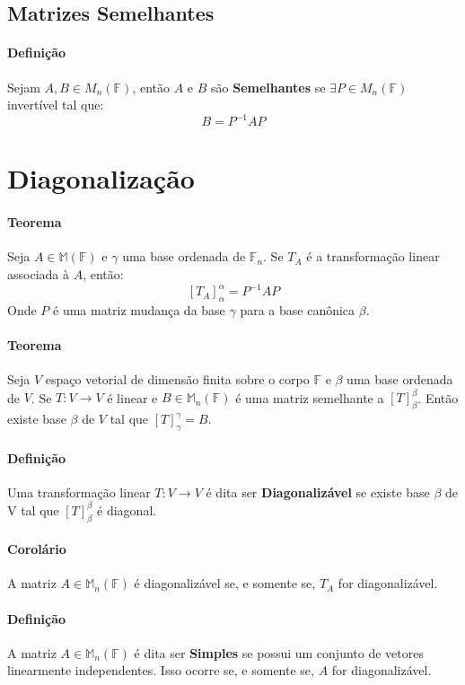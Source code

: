 \documentclass{article}
\begin{document}
        \subsection{Matrizes Semelhantes}
            \paragraph{Definição}Sejam $A, B \in M_{n}(\mathbb{F})$, então $A$ e $B$ são \textbf{Semelhantes} se $\exists P\in M_{n}(\mathbb{F})$ invertível tal que:
                \[\boxed{B = P^{-1} A P}\]
\newpage

    \section{Diagonalização}
        \paragraph{Teorema}Seja $A\in\mathbb{M}(\mathbb{F})$ e $\gamma$ uma base ordenada de $\mathbb{F}_{n}$. Se $T_{A}$ é a transformação linear associada à $A$, então:
            \[\boxed{[T_{A}]_{\alpha}^{\alpha} = P^{-1} A P}\]
        Onde $P$ é uma matriz mudança da base $\gamma$ para a base canônica $\beta$.

        \paragraph{Teorema}Seja $V$ espaço vetorial de dimensão finita sobre o corpo $\mathbb{F}$ e $\beta$ uma base ordenada de $V$. Se $T: V \rightarrow V$ é linear e $B \in \mathbb{M}_{n}(\mathbb{F})$ é uma matriz semelhante a $[T]_{\beta}^{\beta}$. Então existe base $\beta$ de $V$ tal que $[T]_{\gamma}^{\gamma} = B$.

        \paragraph{Definição}Uma transformação linear $T: V \rightarrow V$ é dita ser \textbf{Diagonalizável} se existe base $\beta$ de V tal que $[T]_{\beta}^{\beta}$ é diagonal.

        \paragraph{Corolário}A matriz $A \in \mathbb{M}_{n}(\mathbb{F})$ é diagonalizável se, e somente se, $T_{A}$ for diagonalizável.

        \paragraph{Definição}A matriz $A \in \mathbb{M}_{n}(\mathbb{F})$ é dita ser \textbf{Simples} se possui um conjunto de vetores linearmente independentes. Isso ocorre se, e somente se, $A$ for diagonalizável.
\end{document}
